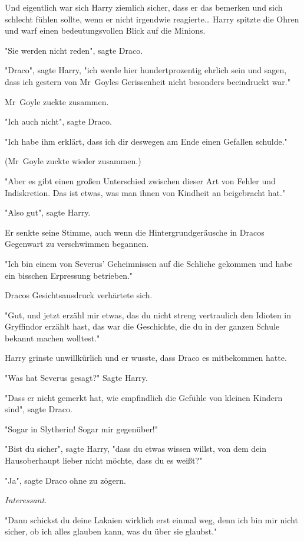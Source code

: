 {Und eigentlich war sich Harry ziemlich sicher, dass er das bemerken und sich schlecht fühlen sollte, wenn er nicht irgendwie reagierte… Harry spitzte die Ohren und warf einen bedeutungsvollen Blick auf die Minions.

"Sie werden nicht reden", sagte Draco.

"Draco", sagte Harry, "ich werde hier hundertprozentig ehrlich sein und sagen, dass ich gestern von Mr~Goyles Gerissenheit nicht besonders beeindruckt war."

Mr~Goyle zuckte zusammen.

"Ich auch nicht", sagte Draco.

"Ich habe ihm erklärt, dass ich dir deswegen am Ende einen Gefallen schulde."

(Mr~Goyle zuckte wieder zusammen.)

"Aber es gibt einen großen Unterschied zwischen dieser Art von Fehler und Indiskretion. Das ist etwas, was man ihnen von Kindheit an beigebracht hat."

"Also gut", sagte Harry.

Er senkte seine Stimme, auch wenn die Hintergrundgeräusche in Dracos Gegenwart zu verschwimmen begannen.

"Ich bin einem von Severus' Geheimnissen auf die Schliche gekommen und habe ein bisschen Erpressung betrieben."

Dracos Gesichtsausdruck verhärtete sich.

"Gut, und jetzt erzähl mir etwas, das du nicht streng vertraulich den Idioten in Gryffindor erzählt hast, das war die Geschichte, die du in der ganzen Schule bekannt machen wolltest."

Harry grinste unwillkürlich und er wusste, dass Draco es mitbekommen hatte.

"Was hat Severus gesagt?" Sagte Harry.

"Dass er nicht gemerkt hat, wie empfindlich die Gefühle von kleinen Kindern sind", sagte Draco.

"Sogar in Slytherin! Sogar mir gegenüber!"

"Bist du sicher", sagte Harry, "dass du etwas wissen willst, von dem dein Hausoberhaupt lieber nicht möchte, dass du es weißt?"

"Ja", sagte Draco ohne zu zögern.

\emph{Interessant}.

"Dann schickst du deine Lakaien wirklich erst einmal weg, denn ich bin mir nicht sicher, ob ich alles glauben kann, was du über sie glaubst."

}
